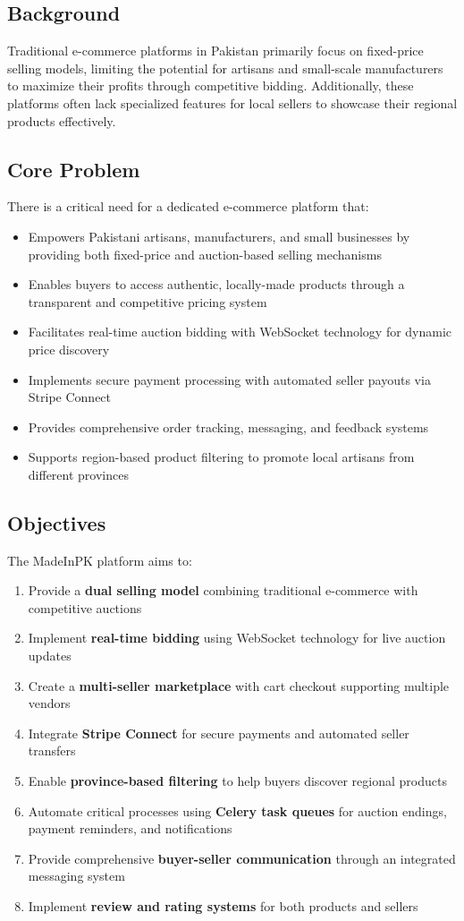 \documentclass[12pt,a4paper]{article}
\begin{document}
\subsection{Background}
Traditional e-commerce platforms in Pakistan primarily focus on fixed-price selling models, limiting the potential for artisans and small-scale manufacturers to maximize their profits through competitive bidding. Additionally, these platforms often lack specialized features for local sellers to showcase their regional products effectively.

\subsection{Core Problem}
There is a critical need for a dedicated e-commerce platform that:
\begin{itemize}[leftmargin=*]
    \item Empowers Pakistani artisans, manufacturers, and small businesses by providing both fixed-price and auction-based selling mechanisms
    \item Enables buyers to access authentic, locally-made products through a transparent and competitive pricing system
    \item Facilitates real-time auction bidding with WebSocket technology for dynamic price discovery
    \item Implements secure payment processing with automated seller payouts via Stripe Connect
    \item Provides comprehensive order tracking, messaging, and feedback systems
    \item Supports region-based product filtering to promote local artisans from different provinces
\end{itemize}

\subsection{Objectives}
The MadeInPK platform aims to:
\begin{enumerate}
    \item Provide a \textbf{dual selling model} combining traditional e-commerce with competitive auctions
    \item Implement \textbf{real-time bidding} using WebSocket technology for live auction updates
    \item Create a \textbf{multi-seller marketplace} with cart checkout supporting multiple vendors
    \item Integrate \textbf{Stripe Connect} for secure payments and automated seller transfers
    \item Enable \textbf{province-based filtering} to help buyers discover regional products
    \item Automate critical processes using \textbf{Celery task queues} for auction endings, payment reminders, and notifications
    \item Provide comprehensive \textbf{buyer-seller communication} through an integrated messaging system
    \item Implement \textbf{review and rating systems} for both products and sellers
\end{enumerate}
\end{document}
